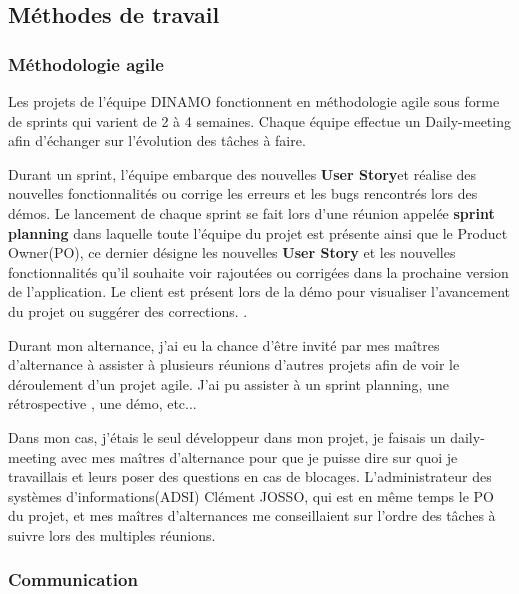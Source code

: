\documentclass[12pt]{article}
\begin{document}
\subsection{Méthodes de travail}
\subsubsection{Méthodologie agile}

Les projets de l'équipe DINAMO fonctionnent en méthodologie agile sous forme de sprints qui varient de 2 à 4 semaines. Chaque équipe effectue un Daily-meeting afin d'échanger sur l'évolution des tâches à faire.

Durant un sprint, l'équipe embarque des nouvelles \textbf{User Story}\footnotemark et réalise des nouvelles fonctionnalités ou corrige les erreurs et les bugs rencontrés lors des démos. Le lancement de chaque sprint se fait lors d'une réunion appelée \textbf{sprint planning} dans laquelle toute l'équipe du projet est présente ainsi que le Product Owner(PO), ce dernier désigne les nouvelles \textbf{User Story} et les nouvelles fonctionnalités qu'il souhaite voir rajoutées ou corrigées dans la prochaine version de l'application. Le client est présent lors de la démo pour visualiser l'avancement du projet ou suggérer des corrections. 
.

Durant mon alternance, j'ai eu la chance d'être invité par mes maîtres d'alternance à assister à plusieurs réunions d'autres projets afin de voir le déroulement d'un projet agile. J'ai pu assister à un sprint planning, une rétrospective , une démo, etc...    

Dans mon cas, j'étais le seul développeur dans mon projet, je faisais un daily-meeting avec mes maîtres d'alternance pour que je puisse dire sur quoi je travaillais et leurs poser des questions en cas de blocages. L'administrateur des systèmes d'informations(ADSI) Clément JOSSO, qui est en même temps le PO du projet, et mes maîtres d'alternances me conseillaient sur l'ordre des tâches à suivre lors des multiples réunions.   

\subsubsection{Communication}
\end{document}
